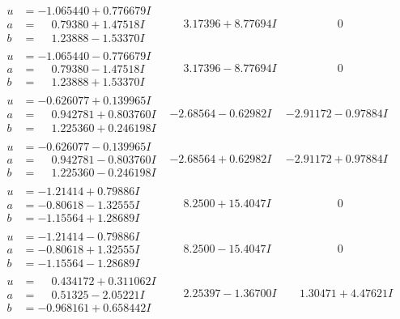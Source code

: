 \documentclass[1p]{elsarticle_modified}
\theoremstyle{definition}
\begin{document}
$$\begin{array}{c|c|c}
\begin{aligned}
u &= -1.065440 + 0.776679 I \\
a &= \phantom{-}0.79380 + 1.47518 I \\
b &= \phantom{-}1.23888 - 1.53370 I\end{aligned}
 & \phantom{-}3.17396 + 8.77694 I & \phantom{-0.000000 } 0 \\ \hline\begin{aligned}
u &= -1.065440 - 0.776679 I \\
a &= \phantom{-}0.79380 - 1.47518 I \\
b &= \phantom{-}1.23888 + 1.53370 I\end{aligned}
 & \phantom{-}3.17396 - 8.77694 I & \phantom{-0.000000 } 0 \\ \hline\begin{aligned}
u &= -0.626077 + 0.139965 I \\
a &= \phantom{-}0.942781 + 0.803760 I \\
b &= \phantom{-}1.225360 + 0.246198 I\end{aligned}
 & -2.68564 - 0.62982 I & -2.91172 - 0.97884 I \\ \hline\begin{aligned}
u &= -0.626077 - 0.139965 I \\
a &= \phantom{-}0.942781 - 0.803760 I \\
b &= \phantom{-}1.225360 - 0.246198 I\end{aligned}
 & -2.68564 + 0.62982 I & -2.91172 + 0.97884 I \\ \hline\begin{aligned}
u &= -1.21414 + 0.79886 I \\
a &= -0.80618 - 1.32555 I \\
b &= -1.15564 + 1.28689 I\end{aligned}
 & \phantom{-}8.2500 + 15.4047 I & \phantom{-0.000000 } 0 \\ \hline\begin{aligned}
u &= -1.21414 - 0.79886 I \\
a &= -0.80618 + 1.32555 I \\
b &= -1.15564 - 1.28689 I\end{aligned}
 & \phantom{-}8.2500 - 15.4047 I & \phantom{-0.000000 } 0 \\ \hline\begin{aligned}
u &= \phantom{-}0.434172 + 0.311062 I \\
a &= \phantom{-}0.51325 - 2.05221 I \\
b &= -0.968161 + 0.658442 I\end{aligned}
 & \phantom{-}2.25397 - 1.36700 I & \phantom{-}1.30471 + 4.47621 I \\ \hline\begin{aligned}

\end{aligned}
\end{array}$$
\end{document}
